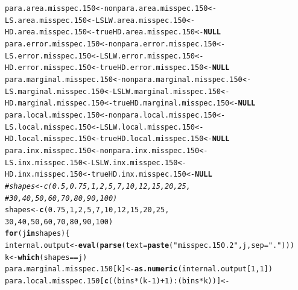 \documentclass[11pt]{article}\usepackage[]{graphicx}\usepackage[]{color}
\makeatletter
\newcommand{\hlnum}[1]{\textcolor[rgb]{0.686,0.059,0.569}{#1}}%
\newcommand{\hlstr}[1]{\textcolor[rgb]{0.192,0.494,0.8}{#1}}%
\newcommand{\hlcom}[1]{\textcolor[rgb]{0.678,0.584,0.686}{\textit{#1}}}%
\newcommand{\hlopt}[1]{\textcolor[rgb]{0,0,0}{#1}}%
\newcommand{\hlstd}[1]{\textcolor[rgb]{0.345,0.345,0.345}{#1}}%
\newcommand{\hlkwa}[1]{\textcolor[rgb]{0.161,0.373,0.58}{\textbf{#1}}}%
\newcommand{\hlkwb}[1]{\textcolor[rgb]{0.69,0.353,0.396}{#1}}%
\newcommand{\hlkwc}[1]{\textcolor[rgb]{0.333,0.667,0.333}{#1}}%
\newcommand{\hlkwd}[1]{\textcolor[rgb]{0.737,0.353,0.396}{\textbf{#1}}}%
\newenvironment{kframe}{%
 \def\at@end@of@kframe{}%
 \ifinner\ifhmode%
  \def\at@end@of@kframe{\end{minipage}}%
  \begin{minipage}{\columnwidth}%
 \fi\fi%
 \def\FrameCommand##1{\hskip\@totalleftmargin \hskip-\fboxsep
 \colorbox{shadecolor}{##1}\hskip-\fboxsep
     \hskip-\linewidth \hskip-\@totalleftmargin \hskip\columnwidth}%
 \MakeFramed {\advance\hsize-\width
   \@totalleftmargin\z@ \linewidth\hsize
   \@setminipage}}%
 {\par\unskip\endMakeFramed%
 \at@end@of@kframe}
\newenvironment{knitrout}{}{} %
\makeatother
\begin{document}
\begin{knitrout}
\color{fgcolor}\begin{kframe}
\begin{alltt}
\hlstd{para.area.misspec.150} \hlkwb{<-} \hlstd{nonpara.area.misspec.150} \hlkwb{<-}
  \hlstd{LS.area.misspec.150} \hlkwb{<-} \hlstd{LSLW.area.misspec.150} \hlkwb{<-}
  \hlstd{HD.area.misspec.150} \hlkwb{<-} \hlstd{trueHD.area.misspec.150} \hlkwb{<-} \hlkwa{NULL}
\hlstd{para.error.misspec.150} \hlkwb{<-} \hlstd{nonpara.error.misspec.150} \hlkwb{<-}
  \hlstd{LS.error.misspec.150} \hlkwb{<-} \hlstd{LSLW.error.misspec.150} \hlkwb{<-}
  \hlstd{HD.error.misspec.150} \hlkwb{<-} \hlstd{trueHD.error.misspec.150} \hlkwb{<-} \hlkwa{NULL}
\hlstd{para.marginal.misspec.150} \hlkwb{<-} \hlstd{nonpara.marginal.misspec.150} \hlkwb{<-}
  \hlstd{LS.marginal.misspec.150} \hlkwb{<-} \hlstd{LSLW.marginal.misspec.150} \hlkwb{<-}
  \hlstd{HD.marginal.misspec.150} \hlkwb{<-} \hlstd{trueHD.marginal.misspec.150} \hlkwb{<-} \hlkwa{NULL}
\hlstd{para.local.misspec.150} \hlkwb{<-} \hlstd{nonpara.local.misspec.150} \hlkwb{<-}
  \hlstd{LS.local.misspec.150} \hlkwb{<-} \hlstd{LSLW.local.misspec.150} \hlkwb{<-}
  \hlstd{HD.local.misspec.150} \hlkwb{<-} \hlstd{trueHD.local.misspec.150} \hlkwb{<-} \hlkwa{NULL}
\hlstd{para.inx.misspec.150} \hlkwb{<-} \hlstd{nonpara.inx.misspec.150} \hlkwb{<-}
  \hlstd{LS.inx.misspec.150} \hlkwb{<-} \hlstd{LSLW.inx.misspec.150} \hlkwb{<-}
  \hlstd{HD.inx.misspec.150} \hlkwb{<-} \hlstd{trueHD.inx.misspec.150} \hlkwb{<-} \hlkwa{NULL}
\hlcom{#shapes <- c(0.5, 0.75, 1, 2, 5, 7, 10, 12, 15, 20, 25, }
\hlcom{#  30, 40, 50, 60, 70, 80, 90, 100)}
\hlstd{shapes} \hlkwb{<-} \hlkwd{c}\hlstd{(}\hlnum{0.75}\hlstd{,} \hlnum{1}\hlstd{,} \hlnum{2}\hlstd{,} \hlnum{5}\hlstd{,} \hlnum{7}\hlstd{,} \hlnum{10}\hlstd{,} \hlnum{12}\hlstd{,} \hlnum{15}\hlstd{,} \hlnum{20}\hlstd{,} \hlnum{25}\hlstd{,}
  \hlnum{30}\hlstd{,} \hlnum{40}\hlstd{,} \hlnum{50}\hlstd{,} \hlnum{60}\hlstd{,} \hlnum{70}\hlstd{,} \hlnum{80}\hlstd{,} \hlnum{90}\hlstd{,} \hlnum{100}\hlstd{)}
\hlkwa{for}\hlstd{(j} \hlkwa{in} \hlstd{shapes )\{}
  \hlstd{internal.output} \hlkwb{<-} \hlkwd{eval}\hlstd{(}\hlkwd{parse}\hlstd{(}\hlkwc{text}\hlstd{=}\hlkwd{paste}\hlstd{(}\hlstr{"misspec.150.2"}\hlstd{, j,} \hlkwc{sep} \hlstd{=} \hlstr{"."}\hlstd{)))}
  \hlstd{k} \hlkwb{<-} \hlkwd{which}\hlstd{(shapes} \hlopt{==} \hlstd{j)}
  \hlstd{para.marginal.misspec.150[k]} \hlkwb{<-} \hlkwd{as.numeric}\hlstd{(internal.output[}\hlnum{1}\hlstd{,} \hlnum{1}\hlstd{])}
  \hlstd{para.local.misspec.150[}\hlkwd{c}\hlstd{((bins}\hlopt{*}\hlstd{(k}\hlopt{-}\hlnum{1}\hlstd{)}\hlopt{+}\hlnum{1}\hlstd{)}\hlopt{:}\hlstd{(bins}\hlopt{*}\hlstd{k))]} \hlkwb{<-}

\end{alltt}
\end{kframe}
\end{knitrout}
\end{document}
